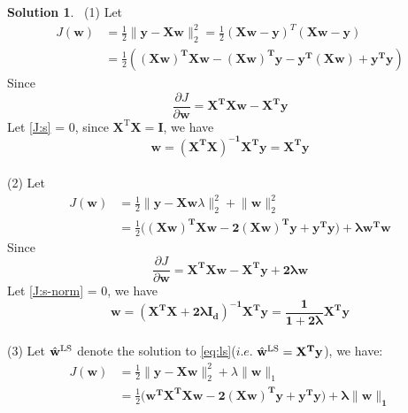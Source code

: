 \documentclass[a4paper,UTF8]{article}
\numberwithin{equation}{section}
\theoremstyle{definition}
\newtheorem*{solution}{Solution}
\begin{document}
\begin{solution} $\,$ \newline
(1)  Let 
\begin{equation}
\begin{split}
J(\mathbf{w}) &= \frac{1}{2} \lVert \mathbf{y} - \mathbf {X}\mathbf{w} \rVert_2^2 = \frac{1}{2} (\mathbf{Xw-y})^T(\mathbf{Xw-y}) \\
&= \frac{1}{2}  (\mathbf{	(Xw)^TXw-(Xw)^Ty-y^T(Xw)+y^Ty	})
\end{split}
\end{equation}
Since
\begin{equation}
\label{J:s}
\frac{\partial J}{\partial\mathbf{w}}=\mathbf{X^TXw-X^{T}y}
\end{equation}
Let  \eqref{J:s} = 0, since $\mathbf{X}^\mathrm{T}\mathbf{X} = \mathbf{I}$, we have
\begin{equation}
\mathbf{w}=\mathbf{(X^T X)^{-1}X^T y} = \mathbf{X^T y}
\end{equation}
~\\
(2)	Let 
\begin{equation}
\begin{split}
J(\mathbf{w}) &= \frac{1}{2}\lVert \mathbf{y} - \mathbf X \mathbf{w} \lambda \rVert_2^2 + \lVert \mathbf{w}\rVert_2^2 \\
&= \frac{1}{2} (\mathbf{(Xw)^TXw-2(Xw)^Ty+y^Ty)	 + \lambda w^Tw}
\end{split}
\end{equation}
Since
\begin{equation}
\label{J:s-norm}
\frac{\partial J}{\partial\mathbf{w}}=\mathbf{X^TXw-X^{T}y + 2 \lambda w}
\end{equation}
Let  \eqref{J:s-norm} = 0, we have
\begin{equation}
\mathbf{w}=\mathbf{(X^T X + 2\lambda I_d)^{-1}X^T y}  = \mathbf{\frac{1}{1 +2 \lambda}X^T y} 
\end{equation}
~\\
\newcommand{\wls}{\hat{\mathbf{w}}^{{\small \text{LS}}}}
\newcommand{\boldw}{\mathbf{w}}
\newcommand{\wlasso}{\hat{\mathbf{w}}^{{\text{lasso}}}} 
(3) Let $\wls$ denote the solution to \eqref{eq:ls}($\textit{i.e.}$ $\wls = \mathbf{X^T y}$), we have:
\begin{equation}
\begin{split}
J(\mathbf{w})  &=  \frac{1}{2} \| \mathbf{y - X w} \|_2^2 + \lambda \| \mathbf{w}\|_1   \\
&=  \frac{1}{2} (\mathbf{w^TX^TXw-2(Xw)^Ty+y^Ty)	 + \lambda  \| \mathbf{w}\|_1  }  \\

\end{split}
\end{equation}
\end{solution}
\end{document}
